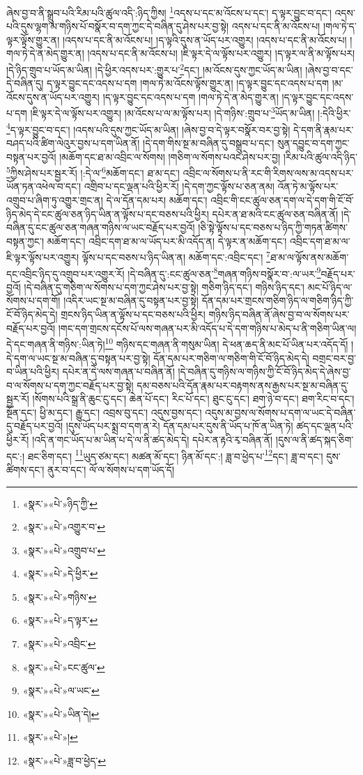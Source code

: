 ཞེས་བྱ་བ་ནི་སྒྲུབ་པའི་རིམ་པའི་ཚུལ་འདི་:ཉིད་ཀྱིས། \footnote{«སྣར་»«པེ་»ཉིད་ཀྱི་}འདས་པ་དང་མ་འོངས་པ་དང་། ད་ལྟར་བྱུང་བ་དང་། འདས་པའི་དུས་ལྷག་མ་གཉིས་པོ་བསྣོར་བ་དག་ཀྱང་དེ་བཞིན་དུ་ཤེས་པར་བྱ་སྟེ། འདས་པ་དང་ནི་མ་འོངས་པ། །གལ་ཏེ་ད་ལྟར་ལྟོས་གྱུར་ན། །འདས་པ་དང་ནི་མ་འོངས་པ། །ད་ལྟའི་དུས་ན་ཡོད་པར་འགྱུར། །འདས་པ་དང་ནི་མ་འོངས་པ། །གལ་ཏེ་དེ་ན་མེད་གྱུར་ན། །འདས་པ་དང་ནི་མ་འོངས་པ། །ཇི་ལྟར་དེ་ལ་ལྟོས་པར་འགྱུར། །ད་ལྟར་ལ་ནི་མ་ལྟོས་པར། །དེ་ཉིད་གྲུབ་པ་ཡོད་མ་ཡིན། །དེ་ཕྱིར་འདས་པར་:གྱུར་པ་\footnote{«སྣར་»«པེ་»འགྱུར་བ་}དང་། །མ་འོངས་དུས་ཀྱང་ཡོད་མ་ཡིན། །ཞེས་བྱ་བ་དང་དེ་བཞིན་དུ། ད་ལྟར་བྱུང་དང་འདས་པ་དག །གལ་ཏེ་མ་འོངས་ལྟོས་གྱུར་ན། །ད་ལྟར་བྱུང་དང་འདས་པ་དག །མ་འོངས་དུས་ན་ཡོད་པར་འགྱུར། །ད་ལྟར་བྱུང་དང་འདས་པ་དག །གལ་ཏེ་དེ་ན་མེད་གྱུར་ན། །ད་ལྟར་བྱུང་དང་འདས་པ་དག །ཇི་ལྟར་དེ་ལ་ལྟོས་པར་འགྱུར། །མ་འོངས་པ་ལ་མ་ལྟོས་པར། །དེ་གཉིས་:གྲུབ་པ་\footnote{«སྣར་»«པེ་»འགྲུབ་པ་}ཡོད་མ་ཡིན། །:དེའི་ཕྱིར་\footnote{«སྣར་»«པེ་»དེ་ཕྱིར་}ད་ལྟར་བྱུང་བ་དང་། །འདས་པའི་དུས་ཀྱང་ཡོད་མ་ཡིན། །ཞེས་བྱ་བ་དེ་ལྟར་བསྣོར་བར་བྱ་སྟེ། དེ་དག་ནི་རྣམ་པར་བཤད་པའི་ཚིག་ལེའུར་བྱས་པ་དག་ཡིན་ནོ། །དེ་དག་གིས་སྔ་མ་བཞིན་དུ་བསྒྲུབ་པ་དང་། སུན་དབྱུང་བ་དག་ཀྱང་བསྟན་པར་བྱའོ། །མཆོག་དང་ཐ་མ་འབྲིང་ལ་སོགས། །གཅིག་ལ་སོགས་པའང་ཤེས་པར་བྱ། །རིམ་པའི་ཚུལ་འདི་ཉིད་\footnote{«སྣར་»«པེ་»གཉིས་}ཀྱིས་ཤེས་པར་སྦྱར་རོ། །:དེ་ལ་\footnote{«སྣར་»«པེ་»ད་ལྟར་}མཆོག་དང་། ཐ་མ་དང་། འབྲིང་ལ་སོགས་པ་ནི་རང་གི་རིགས་ལས་མ་འདས་པར་ཡོན་ཏན་འཕེལ་བ་དང་། འགྲིབ་པ་དང་ལྡན་པའི་ཕྱིར་རོ། །དེ་དག་ཀྱང་ལྟོས་པ་ཅན་ནམ། འོན་ཏེ་མ་ལྟོས་པར་འགྲུབ་པ་ཞིག་ཏུ་འགྱུར་གྲང་ན། དེ་ལ་དོན་དམ་པར། མཆོག་དང་། འབྲིང་གི་ངང་ཚུལ་ཅན་དག་ལ་དེ་དག་གི་ངོ་བོ་ཉིད་མེད་དེ་ངང་ཚུལ་ཅན་ཉིད་ཡིན་ན་ལྟོས་པ་དང་བཅས་པའི་ཕྱིར། དཔེར་ན་ཐ་མའི་ངང་ཚུལ་ཅན་བཞིན་ནོ། །དེ་བཞིན་དུ་ངང་ཚུལ་ཅན་གཞན་གཉིས་ལ་ཡང་བརྗོད་པར་བྱའོ། །ཅི་སྟེ་ལྟོས་པ་དང་བཅས་པ་ཉིད་ཀྱི་གཏན་ཚིགས་བསྟན་ཀྱང་། མཆོག་དང་། འབྲིང་དག་ཐ་མ་ལ་ཡོད་པར་མི་འདོད་ན། དེ་ལྟར་ན་མཆོག་དང་། འབྲིང་དག་ཐ་མ་ལ་ཇི་ལྟར་ལྟོས་པར་འགྱུར། ལྟོས་པ་དང་བཅས་པ་ཉིད་ཡིན་ན། མཆོག་དང་:འབྲིང་དང་། \footnote{«སྣར་»«པེ་»འབྲིང་}ཐ་མ་ལ་ལྟོས་ནས་མཆོག་དང་འབྲིང་ཉིད་དུ་འགྲུབ་པར་འགྱུར་རོ། །དེ་བཞིན་དུ་:ངང་ཚུལ་ཅན་\footnote{«སྣར་»«པེ་»ངང་ཚུལ་}གཞན་གཉིས་བསྣོར་བ་:ལ་ཡར་\footnote{«སྣར་»«པེ་»ལ་ཡང་}བརྗོད་པར་བྱའོ། །དེ་བཞིན་དུ་གཅིག་ལ་སོགས་པ་དག་ཀྱང་ཤེས་པར་བྱ་སྟེ། གཅིག་ཉིད་དང་། གཉིས་ཉིད་དང་། མང་པོ་ཉིད་ལ་སོགས་པ་དག་གོ། །འདིར་ཡང་སྔ་མ་བཞིན་དུ་བསྟན་པར་བྱ་སྟེ། དོན་དམ་པར་གྲངས་གཅིག་ཉིད་ལ་གཅིག་ཉིད་ཀྱི་ངོ་བོ་ཉིད་མེད་དེ། གྲངས་ཉིད་ཡིན་ན་ལྟོས་པ་དང་བཅས་པའི་ཕྱིར། གཉིས་ཉིད་བཞིན་ནོ་ཞེས་བྱ་བ་ལ་སོགས་པར་བརྗོད་པར་བྱའོ། །གང་དག་གྲངས་དངོས་པོ་ལས་གཞན་པར་མི་འདོད་པ་དེ་དག་གཉིས་པ་མེད་པ་ནི་གཅིག་ཡིན་ལ། དེ་དང་གཞན་ནི་གཉིས་:ཡིན་ཏེ།\footnote{«སྣར་»«པེ་»ཡིན་དེ།} གཉིས་དང་གཞན་ནི་གསུམ་ཡིན། དེ་ཕན་ཆད་ནི་མང་པོ་ཡིན་པར་འདོད་དོ། །དེ་དག་ལ་ཡང་སྔ་མ་བཞིན་དུ་བསྟན་པར་བྱ་སྟེ། དོན་དམ་པར་གཅིག་ལ་གཅིག་གི་ངོ་བོ་ཉིད་མེད་དེ། བགྲང་བར་བྱ་བ་ཡིན་པའི་ཕྱིར། དཔེར་ན་དེ་ལས་གཞན་པ་བཞིན་ནོ། །དེ་བཞིན་དུ་གཉིས་ལ་གཉིས་ཀྱི་ངོ་བོ་ཉིད་མེད་དེ་ཞེས་བྱ་བ་ལ་སོགས་པ་དག་ཀྱང་བརྗོད་པར་བྱ་སྟེ། དམ་བཅས་པའི་དོན་རྣམ་པར་བརྟགས་ནས་རྒྱས་པར་སྔ་མ་བཞིན་དུ་སྦྱར་རོ། །སོགས་པའི་སྒྲ་ནི་ཆུང་ངུ་དང་། ཆེན་པོ་དང་། རིང་པོ་དང་། ཐུང་ངུ་དང་། ཐག་ཉེ་བ་དང་། ཐག་རིང་བ་དང་། སྔོན་དང་། ཕྱི་མ་དང་། རྒྱུ་དང་། འབྲས་བུ་དང་། འདུས་བྱས་དང་། འདུས་མ་བྱས་ལ་སོགས་པ་དག་ལ་ཡང་དེ་བཞིན་དུ་བརྗོད་པར་བྱའོ། །དུས་ཡོད་པར་སྨྲ་བ་དག་ན་རེ། དོན་དམ་པར་དུས་ནི་ཡོད་པ་ཁོ་ན་ཡིན་ཏེ། ཚད་དང་ལྡན་པའི་ཕྱིར་རོ། །འདི་ན་གང་ཡོད་པ་མ་ཡིན་པ་དེ་ལ་ནི་ཚད་མེད་དེ། དཔེར་ན་རྟའི་རྭ་བཞིན་ནོ། །དུས་ལ་ནི་ཚད་སྐད་ཅིག་དང་:། ཐང་ཅིག་དང་། \footnote{«སྣར་»«པེ་»།  }ཡུད་ཙམ་དང་། མཚན་མོ་དང་། ཉིན་མོ་དང་:། ཟླ་བ་ཕྱེད་པ་\footnote{«སྣར་»«པེ་»ཟླ་བ་ཕྱེད་}དང་། ཟླ་བ་དང་། དུས་ཚིགས་དང་། ནུར་བ་དང་། ལོ་ལ་སོགས་པ་དག་ཡོད་དོ། 